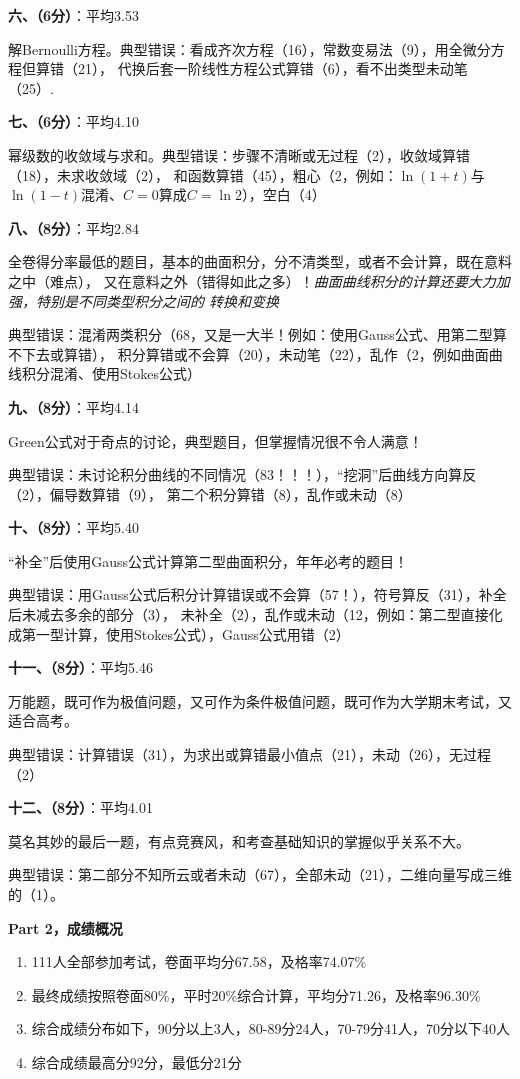{\bf 六、（6分）}：平均3.53

解Bernoulli方程。典型错误：看成齐次方程（16），常数变易法（9），用全微分方程但算错（21），
代换后套一阶线性方程公式算错（6），看不出类型未动笔（25）.

{\bf 七、（6分）}：平均4.10

幂级数的收敛域与求和。典型错误：步骤不清晰或无过程（2），收敛域算错（18），未求收敛域（2），
和函数算错（45），粗心（2，例如：$\ln(1+t)$与$\ln(1-t)$混淆、$C=0$算成$C=\ln2$），空白（4）

{\bf 八、（8分）}：平均2.84

全卷得分率最低的题目，基本的曲面积分，分不清类型，或者不会计算，既在意料之中（难点），
又在意料之外（错得如此之多）！{\it 曲面曲线积分的计算还要大力加强，特别是不同类型积分之间的
转换和变换}

典型错误：混淆两类积分（68，又是一大半！例如：使用Gauss公式、用第二型算不下去或算错），
积分算错或不会算（20），未动笔（22），乱作（2，例如曲面曲线积分混淆、使用Stokes公式）

{\bf 九、（8分）}：平均4.14

Green公式对于奇点的讨论，典型题目，但掌握情况很不令人满意！

典型错误：未讨论积分曲线的不同情况（83！！！），“挖洞”后曲线方向算反（2），偏导数算错（9），
第二个积分算错（8），乱作或未动（8）

{\bf 十、（8分）}：平均5.40

“补全”后使用Gauss公式计算第二型曲面积分，年年必考的题目！

典型错误：用Gauss公式后积分计算错误或不会算（57！），符号算反（31），补全后未减去多余的部分（3），
未补全（2），乱作或未动（12，例如：第二型直接化成第一型计算，使用Stokes公式），Gauss公式用错（2）

{\bf 十一、（8分）}：平均5.46

万能题，既可作为极值问题，又可作为条件极值问题，既可作为大学期末考试，又适合高考。

典型错误：计算错误（31），为求出或算错最小值点（21），未动（26），无过程（2）

{\bf 十二、（8分）}：平均4.01

莫名其妙的最后一题，有点竞赛风，和考查基础知识的掌握似乎关系不大。

典型错误：第二部分不知所云或者未动（67），全部未动（21），二维向量写成三维的（1）。

\bigskip
{\large\bf Part 2，成绩概况}

\begin{enumerate}[(1)]
  \setlength{\itemindent}{1cm}
  \item 111人全部参加考试，卷面平均分67.58，及格率74.07\%
  \item 最终成绩按照卷面80\%，平时20\%综合计算，平均分71.26，及格率96.30\%
  \item 综合成绩分布如下，90分以上3人，80-89分24人，70-79分41人，70分以下40人
  \item 综合成绩最高分92分，最低分21分
\end{enumerate}

